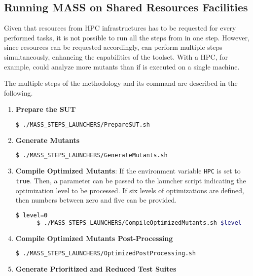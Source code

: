 \subsection{Running MASS on Shared Resources Facilities}

Given that resources from HPC infrastructures has to be requested for every performed tasks, it is not possible to run all the steps from \MASS in one step. 
However, since resources can be requested accordingly, \MASS can perform multiple steps simultaneously, enhancing the capabilities of the toolset. With a HPC, for example, \MASS could analyze more mutants than if \MASS is executed on a single machine.

The multiple steps of the methodology and its command are described in the following.

\begin{enumerate}
	\item \textbf{Prepare the SUT}

	\begin{lstlisting}[language=bash]
	  $ ./MASS_STEPS_LAUNCHERS/PrepareSUT.sh
\end{lstlisting}

	\item \textbf{Generate Mutants}

	\begin{lstlisting}[language=bash]
	  $ ./MASS_STEPS_LAUNCHERS/GenerateMutants.sh
\end{lstlisting}

	\item \textbf{Compile Optimized Mutants}: If the environment variable \texttt{HPC} is set to \texttt{true}. Then, a parameter can be passed to the launcher script indicating the optimization level to be processed. If six levels of optimizations are defined, then numbers between zero and five can be provided.

	\begin{lstlisting}[language=bash]
	  $ level=0
	  $ ./MASS_STEPS_LAUNCHERS/CompileOptimizedMutants.sh $level
\end{lstlisting}

	\item \textbf{Compile Optimized Mutants Post-Processing}

	\begin{lstlisting}[language=bash]
	  $ ./MASS_STEPS_LAUNCHERS/OptimizedPostProcessing.sh
\end{lstlisting}

	\item \textbf{Generate Prioritized and Reduced Test Suites}


\end{enumerate}
